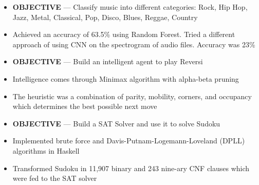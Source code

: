 \documentclass[10pt,a4paper]{altacv}
\begin{document}
\begin{itemize}
	\item \textbf{OBJECTIVE} --- Classify music into different categories: Rock, Hip Hop, Jazz, Metal, Classical, Pop, Disco, Blues, Reggae, Country
	\item Achieved an accuracy of 63.5\% using Random Forest. Tried a different approach of using CNN on the spectrogram of audio files. Accuracy was 23\%
\end{itemize}

\divider

\begin{itemize}
	\item \textbf{OBJECTIVE} --- Build an intelligent agent to play Reversi
	\item Intelligence comes through Minimax algorithm with alpha-beta pruning
	\item The heuristic was a combination of parity, mobility, corners, and occupancy which determines the best possible next move
\end{itemize}

\divider

\begin{itemize}
	\item \textbf{OBJECTIVE} --- Build a SAT Solver and use it to solve Sudoku
	\item Implemented brute force and Davis-Putnam-Logemann-Loveland (DPLL) algorithms in Haskell%
	\item Transformed Sudoku in 11,907 binary and 243 nine-ary CNF clauses which were fed to the SAT solver
\end{itemize}

\divider
\end{document}
